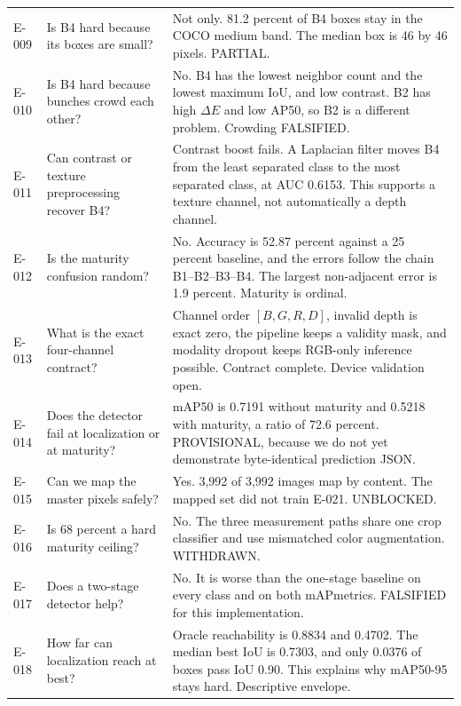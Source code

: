 \documentclass[preprint,12pt]{elsarticle}
\newcommand{\E}[1]{E-#1}
\newcommand{\mAP}{mAP}
\begin{document}
\begin{longtable}{L{0.07\textwidth}L{0.28\textwidth}L{0.55\textwidth}}
\E{009} & Is B4 hard because its boxes are small? & Not only. 81.2 percent of B4
boxes stay in the COCO medium band. The median box is 46 by 46 pixels.
PARTIAL.\\

\E{010} & Is B4 hard because bunches crowd each other? & No. B4 has the lowest
neighbor count and the lowest maximum IoU, and low contrast. B2 has high
$\Delta E$ and low AP50, so B2 is a different problem. Crowding FALSIFIED.\\

\E{011} & Can contrast or texture preprocessing recover B4? & Contrast boost
fails. A Laplacian filter moves B4 from the least separated class to the most
separated class, at AUC 0.6153. This supports a texture channel, not
automatically a depth channel.\\

\E{012} & Is the maturity confusion random? & No. Accuracy is 52.87 percent
against a 25 percent baseline, and the errors follow the chain B1--B2--B3--B4.
The largest non-adjacent error is 1.9 percent. Maturity is ordinal.\\

\E{013} & What is the exact four-channel contract? & Channel order
\([B,G,R,D]\), invalid depth is exact zero, the pipeline keeps a validity mask, and
modality dropout keeps RGB-only inference possible. Contract complete. Device
validation open.\\

\E{014} & Does the detector fail at localization or at maturity? & \mAP50 is
0.7191 without maturity and 0.5218 with maturity, a ratio of 72.6 percent.
PROVISIONAL, because we do not yet demonstrate byte-identical prediction JSON.\\

\E{015} & Can we map the master pixels safely? & Yes. 3,992 of 3,992 images map
by content. The mapped set did not train \E{021}. UNBLOCKED.\\

\E{016} & Is 68 percent a hard maturity ceiling? & No. The three measurement
paths share one crop classifier and use mismatched color augmentation.
WITHDRAWN.\\

\E{017} & Does a two-stage detector help? & No. It is worse than the one-stage
baseline on every class and on both \mAP metrics. FALSIFIED for this
implementation.\\

\E{018} & How far can localization reach at best? & Oracle reachability is
0.8834 and 0.4702. The median best IoU is 0.7303, and only 0.0376 of boxes pass
IoU 0.90. This explains why \mAP50-95 stays hard. Descriptive envelope.\\


\end{longtable}
\end{document}
